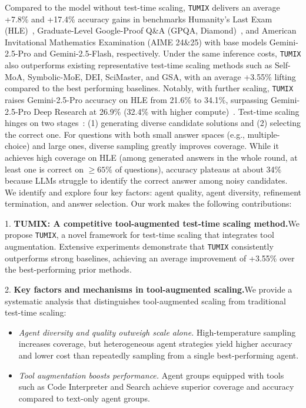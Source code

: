 Compared to the model without test-time scaling, \texttt{TUMIX} delivers an average +7.8\% and +17.4\% accuracy gains in benchmarks Humanity’s Last Exam (HLE)~\citep{HLE}, Graduate-Level Google-Proof Q\&A (GPQA, Diamond)~\citep{gpqa}, and American Invitational Mathematics Examination (AIME 24\&25) with base models Gemini-2.5-Pro and Gemini-2.5-Flash, respectively. Under the same inference costs, \texttt{TUMIX} also outperforms existing representative test-time scaling methods such as Self-MoA, Symbolic-MoE, DEI, SciMaster, and GSA, with an average +3.55\% lifting compared to the best performing baselines. Notably, with further scaling, \texttt{TUMIX} raises Gemini-2.5-Pro accuracy on HLE from 21.6\% to 34.1\%, surpassing Gemini-2.5-Pro Deep Research at 26.9\% (32.4\% with higher compute)~\citep{Gemini-2.5-Pro}. Test-time scaling hinges on two stages~\citep{LLM-monkey}: (1) generating diverse candidate solutions and (2) selecting the correct one. For questions with both small answer spaces (e.g., multiple-choice) and large ones, diverse sampling greatly improves coverage. While it achieves high coverage on HLE (among generated answers in the whole round, at least one is correct on $\geq 65\%$ of questions), accuracy plateaus at about 34\% because LLMs struggle to identify the correct answer among noisy candidates. We identify and explore four key factors: agent quality, agent diversity, refinement termination, and answer selection. Our work makes the following contributions:

1. \textbf{TUMIX: A competitive tool-augmented test-time scaling method.}\quad We propose \texttt{TUMIX}, a novel framework for test-time scaling that integrates tool augmentation. Extensive experiments demonstrate that \texttt{TUMIX} consistently outperforms strong baselines, achieving an average improvement of +3.55\% over the best-performing prior methods.

2. \textbf{Key factors and mechanisms in tool-augmented scaling.}\quad We provide a systematic analysis that distinguishes tool-augmented scaling from traditional test-time scaling:  
\begin{itemize}[left=0pt, nosep]
    \item \textit{Agent diversity and quality outweigh scale alone.} High-temperature sampling increases coverage, but heterogeneous agent strategies yield higher accuracy and lower cost than repeatedly sampling from a single best-performing agent.  
    \item \textit{Tool augmentation boosts performance.} Agent groups equipped with tools such as Code Interpreter and Search achieve superior coverage and accuracy compared to text-only agent groups.
\end{itemize}

